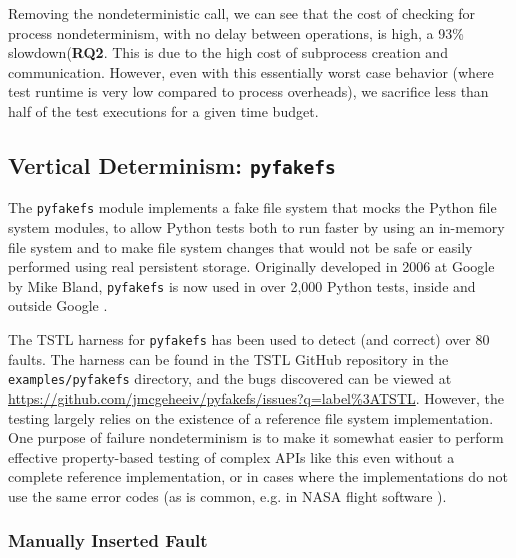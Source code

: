 Removing the nondeterministic call, we can see that the cost of
checking for process nondeterminism, with no delay between operations,
is high, a 93\% slowdown({\bf RQ2}.  This is due to the high cost of subprocess
creation and communication. However, even with this essentially worst
case behavior (where test runtime is very low compared to process overheads),
we sacrifice less than half of the test executions for a given time budget.

\subsection {Vertical Determinism: {\tt pyfakefs}}

The {\tt pyfakefs} \cite{pyfakefs} module implements a fake file
system that mocks the Python file system modules, to allow Python
tests both to run faster by using an in-memory file system and to make
file system changes that would not be safe or easily performed using
real persistent storage.  Originally developed in 2006 at Google by
Mike Bland, {\tt pyfakefs} is now used in over 2,000 Python tests,
inside and outside Google \cite{pyfakefs}.

The TSTL harness for {\tt pyfakefs} has been used to detect (and
correct) over 80 faults.  The harness can be found in the TSTL GitHub repository
in the {\tt examples/pyfakefs} directory, and the bugs discovered can
be viewed at \url{https://github.com/jmcgeheeiv/pyfakefs/issues?q=label%3ATSTL}.  However, the testing largely relies on
the existence of a reference file system implementation.  One purpose
of failure nondeterminism is to make it somewhat easier to perform effective
property-based testing of
complex APIs like this even without a complete reference implementation, or in cases
where the implementations do not use the same error
codes (as is common, e.g. in NASA flight software
\cite{ICSEDiff,CFV08}).

\subsubsection{Manually Inserted Fault}

